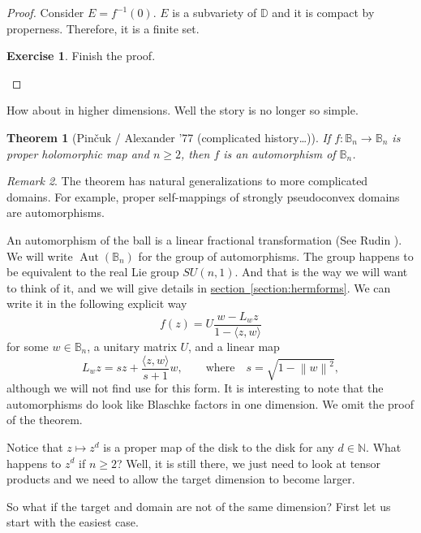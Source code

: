 \documentclass[12pt,openany]{book}
\newcommand{\Aut}{\operatorname{Aut}}
\newcommand{\norm}[1]{\left\lVert {#1} \right\rVert}
\newcommand{\N}{{\mathbb{N}}}
\newcommand{\bB}{{\mathbb{B}}}
\newcommand{\bD}{{\mathbb{D}}}
\theoremstyle{plain}
\newtheorem{thm}{Theorem}[section]
\theoremstyle{remark}
\newtheorem{remark}[thm]{Remark}
\theoremstyle{definition}
\theoremstyle{exercise}
\newtheorem{exercise}{Exercise}[section]
\theoremstyle{example}
\newcommand{\sectionref}[1]{\hyperref[#1]{section~\ref*{#1}}}
\begin{document}
\begin{proof}
Consider $E=f^{-1}(0)$.  $E$ is a subvariety of $\bD$ and it is compact by
properness.  Therefore, it is a finite set.

\begin{exercise}
Finish the proof.
\end{exercise}
\end{proof}

How about in higher dimensions.  Well the story is no longer so simple.

\begin{thm}[Pin{\v c}uk / Alexander '77 (complicated history\ldots)]
If $f \colon \bB_n \to \bB_n$ is proper holomorphic map and $n \geq 2$, then $f$
is an automorphism of $\bB_n$.
\end{thm}

\begin{remark}
The theorem has natural generalizations to more complicated domains.
For example, proper self-mappings of strongly pseudoconvex domains are
automorphisms.
\end{remark}

An automorphism of the ball is a linear fractional transformation
(See Rudin \cite{Rudin:ball}).  We will
write  $\Aut(\bB_n)$ for the group of automorphisms.  The group happens to
be equivalent to the real Lie group $SU(n,1)$.  And that is the way
we will want to think of it, and we will give details in \sectionref{section:hermforms}.
We can write it in the following explicit way
\begin{equation}
f(z) = U \frac{w-L_w z}{1-\langle z,w \rangle}
\end{equation}
for some $w \in \bB_n$, a unitary matrix $U$, and a linear map
\begin{equation}
L_w z = s z + \frac{\langle z , w
\rangle}{s + 1} w ,
\qquad
\text{where} \quad
s = \sqrt{1-\norm{w}^2} ,
\end{equation}
although we will not find use for this form.  It is interesting to note that
the automorphisms do look like Blaschke factors in one dimension.
We omit the proof of the theorem.

Notice that $z \mapsto z^d$ is a proper map of the disk to the disk for any
$d \in \N$.  What happens to $z^d$ if $n \geq 2$?  Well, it is still there,
we just need to look at tensor products and we need to allow the target
dimension to become larger.

So what if the target and domain are not of the same dimension?  First let us
start with the easiest case.
\end{document}
